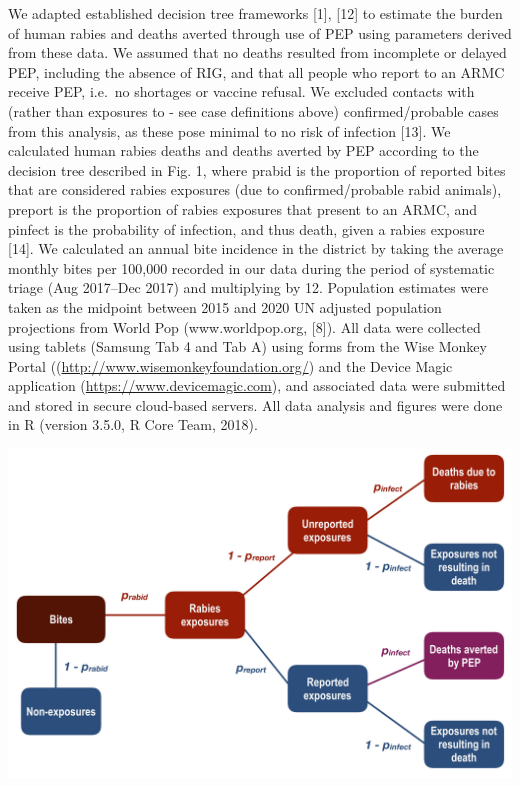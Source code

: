 \documentclass[
]{book}
\begin{document}
We adapted established decision tree frameworks {[}1{]}, {[}12{]} to estimate the burden of human rabies and deaths averted through use of PEP using parameters derived from these data. We assumed that no deaths resulted from incomplete or delayed PEP, including the absence of RIG, and that all people who report to an ARMC receive PEP, i.e.~no shortages or vaccine refusal. We excluded contacts with (rather than exposures to - see case definitions above) confirmed/probable cases from this analysis, as these pose minimal to no risk of infection {[}13{]}. We calculated human rabies deaths and deaths averted by PEP according to the decision tree described in Fig. 1, where prabid is the proportion of reported bites that are considered rabies exposures (due to confirmed/probable rabid animals), preport is the proportion of rabies exposures that present to an ARMC, and pinfect is the probability of infection, and thus death, given a rabies exposure {[}14{]}. We calculated an annual bite incidence in the district by taking the average monthly bites per 100,000 recorded in our data during the period of systematic triage (Aug 2017--Dec 2017) and multiplying by 12. Population estimates were taken as the midpoint between 2015 and 2020 UN adjusted population projections from World Pop (www.worldpop.org, {[}8{]}). All data were collected using tablets (Samsung Tab 4 and Tab A) using forms from the Wise Monkey Portal ((\url{http://www.wisemonkeyfoundation.org/}) and the Device Magic application (\url{https://www.devicemagic.com}), and associated data were submitted and stored in secure cloud-based servers. All data analysis and figures were done in R (version 3.5.0, R Core Team, 2018).

\includegraphics[width=0.95\linewidth]{figs/ch1/fig1}
\end{document}
